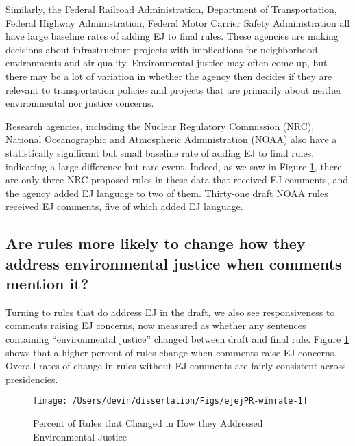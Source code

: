 \documentclass[
      12pt,
        ]{article}
\begin{document}
Similarly, the Federal
Railroad Administration, Department of Transportation, Federal Highway
Administration, Federal Motor Carrier Safety Administration all have large baseline rates of adding EJ to final rules. These agencies are
making decisions about infrastructure projects with implications for
neighborhood environments and air quality. Environmental justice may
often come up, but there may be a lot of variation in whether the agency
then decides if they are relevant to transportation policies and
projects that are primarily about neither environmental nor justice
concerns.

Research agencies, including the Nuclear Regulatory Commission (NRC), National
Oceanographic and Atmospheric Administration (NOAA) also have a statistically significant but small baseline rate of adding EJ to final rules, indicating a large difference but rare event. Indeed, as we saw in Figure \ref{fig:ejejPR-winrate-1}, there are only three NRC proposed rules in these data that received EJ comments, and the agency added EJ language to two of them. Thirty-one draft NOAA rules received EJ comments, five of which added EJ language.

\hypertarget{are-rules-more-likely-to-change-how-they-address-environmental-justice-when-comments-mention-it}{%
\subsection{Are rules more likely to change how they address environmental justice when comments mention it?}\label{are-rules-more-likely-to-change-how-they-address-environmental-justice-when-comments-mention-it}}

Turning to rules that do address EJ in the draft, we also see responsiveness to comments raising EJ concerns, now measured as whether any sentences containing ``environmental justice'' changed between draft and final rule.
Figure \ref{fig:ejejPR-winrate-1} shows that a higher percent of rules change when comments raise EJ concerns. Overall rates of change in rules without EJ comments are fairly consistent across presidencies.

\begin{figure}

{\centering \texttt{[image: /Users/devin/dissertation/Figs/ejejPR-winrate-1]} 

}

\caption{Percent of Rules that Changed in How they Addressed Environmental Justice}\label{fig:ejejPR-winrate-1}
\end{figure}
\end{document}
